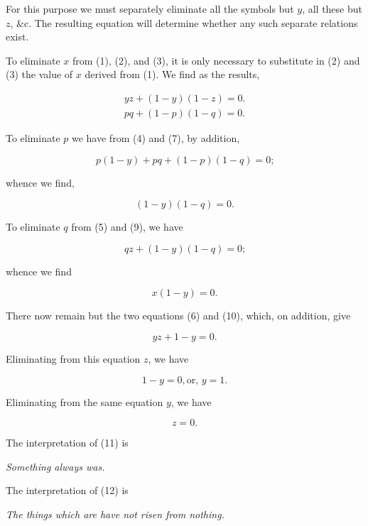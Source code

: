 \documentclass[oneside]{book}
\begin{document}
For this purpose we must separately eliminate all the symbols
but $y$, all these but $z$, \&c. The resulting equation will determine
whether any such separate relations exist.

To eliminate $x$ from (1), (2), and (3), it is only necessary to
substitute in (2) and (3) the value of $x$ derived from (1). We
find as the results,

\begin{eqnarray}
yz+(1-y)(1-z)=0\textrm{.}\\
pq+(1-p)(1-q)=0\textrm{.}
\end{eqnarray}

To eliminate $p$ we have from (4) and (7), by addition,

\begin{equation}
p(1-y)+pq+(1-p)(1-q)=0\textrm{;}
\end{equation}

whence we find,

\begin{equation}
(1-y)(1-q)=0\textrm{.}
\end{equation}

To eliminate $q$ from (5) and (9), we have

\[
qz + (1-y)(1-q) = 0\textrm{;}
\]

whence we find

\begin{equation}
x(1-y) = 0\textrm{.}
\end{equation}

There now remain but the two equations (6) and (10), which,
on addition, give

\[
yz + 1 - y = 0\textrm{.}
\]

Eliminating from this equation $z$, we have

\begin{equation}
1-y = 0, \textrm{or, } y = 1\textrm{.}
\end{equation}

Eliminating from the same equation $y$, we have

\begin{equation}
z = 0\textrm{.}
\end{equation}

The interpretation of (11) is

\textit{Something always was.}

The interpretation of (12) is

\textit{The things which are have not risen from nothing.}
\end{document}
